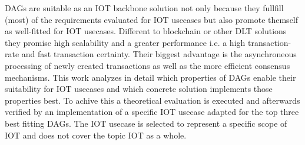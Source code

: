\documentclass[
    ngerman,american
    ]{scrartcl}
\newcommand{\lang}{en}
\begin{document}
\begin{description}[style=unboxed]
            \item [\questionFour{\lang}]
                DAGs are suitable as an IOT backbone solution not only because they fullfill (most) of the requirements evaluated for IOT usecases but also promote themself as well-fitted for IOT usecases.
                Different to blockchain or other DLT solutions they promise high scalability and a greater performance i.e. a high transaction-rate and fast transaction certainty.
                Their biggest advantage is the asynchroneous processing of newly created transactions as well as the more efficient consensus mechanisms.
                This work analyzes in detail which properties of DAGs enable their suitability for IOT usecases and which concrete solution implements those properties best.
                To achive this a theoretical evaluation is executed and afterwards verified by an implementation of a specific IOT usecase adapted for the top three best fitting DAGs.
                The IOT usecase is selected to represent a specific scope of IOT and does not cover the topic IOT as a whole.
        \end{description}
\end{document}
